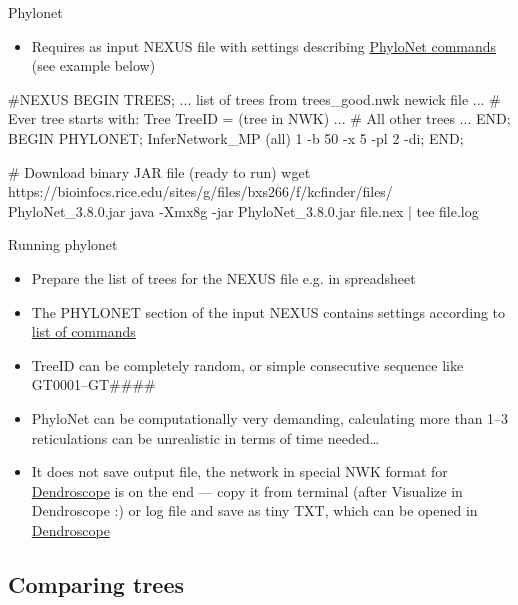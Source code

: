 \documentclass[compress, ucs, xelatex, 11pt, xcolor=x11names, aspectratio=169,
	hyperref={
		bookmarks=true,
		unicode=true,
		colorlinks=true,
		pdftitle={HybSeq course},
		plainpages=false,
		pdfauthor={Vojtech Zeisek},
		pdfsubject={Practical processing of HybSeq target enrichment sequencing data on computing grids like MetaCentrum},
		pdfcreator={XeLaTeX},
		pdfkeywords={BASH, command line, GNU, HybSeq, Linux, MetaCentrum, sequencing shell, target enrichment},
		linkcolor=Turquoise4, %
		anchorcolor=DodgerBlue4, %
		citecolor=DodgerBlue4, %
		filecolor=DodgerBlue4, %
		menucolor=Tan4, %
		urlcolor=DarkOliveGreen4, %
		pdftex},
	url={hyphens, lowtilde} %
	]{beamer}
\renewcommand{\texttt}[1]{\colorbox{Cornsilk2}{{\ttfamily #1}}}
\begin{document}
\begin{frame}[fragile]{Phylonet}
	\begin{itemize}
		\item Requires as input NEXUS file with settings describing \href{https://wiki.rice.edu/confluence/display/PHYLONET/List+of+PhyloNet+Commands}{PhyloNet commands} (see example below)
	\end{itemize}
	\begin{bashcode}
    #NEXUS
    BEGIN TREES;
    ... list of trees from trees_good.nwk newick file ...
    # Ever tree starts with:
    Tree TreeID = (tree in NWK)
    ... # All other trees ...
    END;
    BEGIN PHYLONET;
    InferNetwork_MP (all) 1 -b 50 -x 5 -pl 2 -di;
    END;

    # Download binary JAR file (ready to run)
    wget https://bioinfocs.rice.edu/sites/g/files/bxs266/f/kcfinder/files/
      PhyloNet_3.8.0.jar
    java -Xmx8g -jar PhyloNet_3.8.0.jar file.nex | tee file.log
	\end{bashcode}
\end{frame}

\begin{frame}{Running phylonet}
	\begin{itemize}
		\item Prepare the list of trees for the NEXUS file e.g. in spreadsheet
		\item The \texttt{PHYLONET} section of the input NEXUS contains settings according to \href{https://wiki.rice.edu/confluence/display/PHYLONET/List+of+PhyloNet+Commands}{list of commands}
		\item TreeID can be completely random, or simple consecutive sequence like GT0001--GT\#\#\#\#
		\item PhyloNet can be computationally very demanding, calculating more than 1--3 reticulations can be unrealistic in terms of time needed\ldots
		\item It does not save output file, the network in special NWK format for \href{https://www.wsi.uni-tuebingen.de/lehrstuehle/algorithms-in-bioinformatics/software/dendroscope/}{Dendroscope} is on the end --- copy it from terminal (after \texttt{Visualize in Dendroscope :}) or log file and save as tiny TXT, which can be opened in \href{https://www.wsi.uni-tuebingen.de/lehrstuehle/algorithms-in-bioinformatics/software/dendroscope/}{Dendroscope}
	\end{itemize}
\end{frame}

\subsection{Comparing trees}
\end{document}
